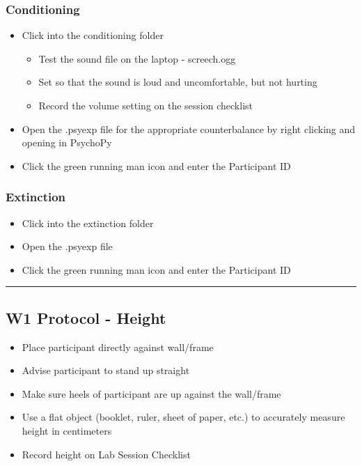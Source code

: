 \documentclass[]{book}
\providecommand{\tightlist}{%
  \setlength{\itemsep}{0pt}\setlength{\parskip}{0pt}}
\begin{document}
\hypertarget{conditioning}{%
\subsubsection{Conditioning}\label{conditioning}}

\begin{itemize}
\tightlist
\item
  Click into the conditioning folder

  \begin{itemize}
  \tightlist
  \item
    Test the sound file on the laptop - screech.ogg
  \item
    Set so that the sound is loud and uncomfortable, but not hurting
  \item
    Record the volume setting on the session checklist
  \end{itemize}
\item
  Open the .psyexp file for the appropriate counterbalance by right clicking and opening in PsychoPy
\item
  Click the green running man icon and enter the Participant ID
\end{itemize}

\hypertarget{extinction}{%
\subsubsection{Extinction}\label{extinction}}

\begin{itemize}
\tightlist
\item
  Click into the extinction folder
\item
  Open the .psyexp file
\item
  Click the green running man icon and enter the Participant ID
\end{itemize}

\begin{center}\rule{0.5\linewidth}{0.5pt}\end{center}

\hypertarget{w1-protocol---height}{%
\subsection{W1 Protocol - Height}\label{w1-protocol---height}}

\begin{itemize}
\tightlist
\item
  Place participant directly against wall/frame
\item
  Advise participant to stand up straight
\item
  Make sure heels of participant are up against the wall/frame
\item
  Use a flat object (booklet, ruler, sheet of paper, etc.) to accurately measure height in centimeters
\item
  Record height on Lab Session Checklist
\end{itemize}
\end{document}
